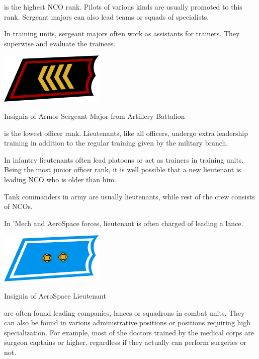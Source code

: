 \documentclass{tufte-book}
\begin{document}
 is the highest NCO rank. Pilots of various kinds
are usually promoted to this rank. Sergeant majors can also lead teams or
squads of specialists.

In training units, sergeant majors often work as assistants for trainers.
They superwise and evaluate the trainees.

\begin{marginfigure}[0\baselineskip]
  \includegraphics[width=5.0cm]{rank-sergeant-major}
  \caption{Insignia of Armor Sergeant Major from Artillery Battalion}
  \label{fig:insignia_sergeant_major}
\end{marginfigure}

 is the lowest officer rank. Lieutenants, like all
officers, undergo extra leadership training in addition to the regular
training given by the military branch.

In infantry lieutenants often lead platoons or act as trainers in training
units. Being the most junior officer rank, it is well possible that a
new lieutenant is leading NCO who is older than him.

Tank commanders in army are usually lieutenants, while rest of the crew
consists of NCOs.

In 'Mech and AeroSpace forces, lieutenant is often charged of leading a
lance.

\begin{marginfigure}[0\baselineskip]
  \includegraphics[width=5.0cm]{rank-lieutenant}
  \caption{Insignia of AeroSpace Lieutenant}
  \label{fig:insignia_lieutenant}
\end{marginfigure}

 are often found leading companies, lances or squadrons
in combat units. They can also be found in various administrative positions or
positions requiring high specialization. For example, most of the doctors
trained by the medical corps are surgeon captains or higher, regardless if
they actually can perform surgeries or not.
\end{document}
